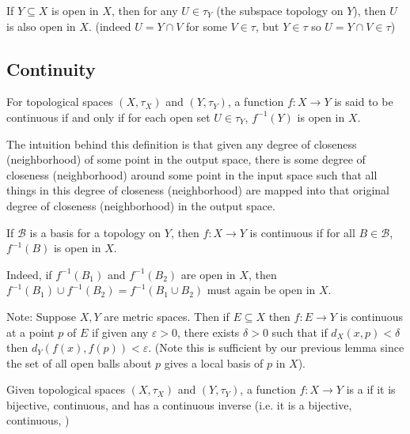 \documentclass[12pt, a4paper, oneside, openright, titlepage]{book}
\begin{document}
\begin{lemma}
    If $Y \subseteq X$ is open in $X$, then for any $U \in \tau_Y$ (the subspace topology on $Y$), then $U$ is also open in $X$. (indeed $U = Y\cap V$ for some $V \in \tau$, but $Y \in \tau$ so $U = Y\cap V \in \tau$)
\end{lemma}


\subsection{Continuity}


\begin{definition}
    For topological spaces $(X,\tau_X)$ and $(Y,\tau_Y)$, a function $f:X\rightarrow Y$ is said to be continuous if and only if for each open set $U \in \tau_Y$, $f^{-1}(Y)$ is open in $X$.
\end{definition}


The intuition behind this definition is that given any degree of closeness (neighborhood) of some point in the output space, there is some degree of closeness (neighborhood) around some point in the input space such that all things in this degree of closeness (neighborhood) are mapped into that original degree of closeness (neighborhood) in the output space.

\begin{lemma}
    If $\mathcal{B}$ is a basis for a topology on $Y$, then $f:X\rightarrow Y$ is continuous if for all $B \in \mathcal{B}$, $f^{-1}(B)$ is open in $X$.
\end{lemma}

Indeed, if $f^{-1}(B_1)$ and $f^{-1}(B_2)$ are open in $X$, then $f^{-1}(B_1)\cup f^{-1}(B_2) = f^{-1}(B_1\cup B_2)$ must again be open in $X$.


Note: Suppose $X,Y$ are metric spaces. Then if $E \subseteq X$ then $f:E\rightarrow Y$ is continuous at a point $p$ of $E$ if given any $\varepsilon > 0$, there exists $\delta > 0$ such that if $d_X(x,p) < \delta$ then $d_Y(f(x),f(p)) < \varepsilon$. (Note this is sufficient by our previous lemma since the set of all open balls about $p$ gives a local basis of $p$ in $X$).



\begin{definition}
    Given topological spaces $(X,\tau_X)$ and $(Y,\tau_Y)$, a function $f:X\rightarrow Y$ is a  if it is bijective, continuous, and has a continuous inverse (i.e. it is a bijective, continuous, )
\end{definition}
\end{document}
